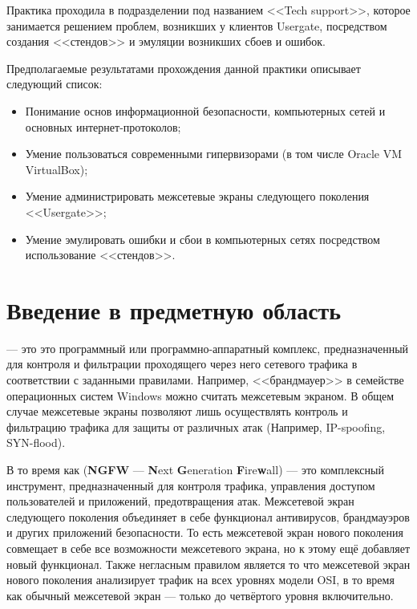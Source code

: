 \begin{justify}
		Практика проходила в подразделении под названием <<Tech support>>, которое занимается решением проблем, возникших у клиентов Usergate, посредством создания <<стендов>> и эмуляции возникших сбоев и ошибок.
		
		Предполагаемые результатами прохождения данной практики описывает следующий список:

		\begin{itemize}[nosep]
			\item Понимание основ информационной безопасности, компьютерных сетей и основных интернет-протоколов;
				
			\item Умение пользоваться современными гипервизорами (в том числе Oracle VM VirtualBox);
			
			\item Умение администрировать межсетевые экраны следующего поколения <<Usergate>>;
			
			\item Умение эмулировать ошибки и сбои в компьютерных сетях посредством использование <<стендов>>.
		\end{itemize}
	\end{justify}
\section{Введение в предметную область}
	\begin{justify}
		\newPar{}  --- это это программный или программно-аппаратный комплекс, предназначенный для контроля и фильтрации проходящего через него сетевого трафика в соответствии с заданными правилами. Например, <<брандмауер>> в семействе операционных систем Windows можно считать межсетевым экраном. В общем случае межсетевые экраны позволяют лишь осуществлять контроль и фильтрацию трафика для защиты от различных атак (Например, IP-spoofing, SYN-flood).
		
		В то время как  (\textbf{NGFW} --- \textbf{N}ext \textbf{G}eneration \textbf{F}ire\textbf{w}all) --- это комплексный инструмент, предназначенный для контроля трафика, управления доступом пользователей и приложений, предотвращения атак. Межсетевой экран следующего поколения объединяет в себе функционал антивирусов, брандмауэров и других приложений безопасности. То есть межсетевой экран нового поколения совмещает в себе все возможности межсетевого экрана, но к этому ещё добавляет новый функционал. Также негласным правилом является то что межсетевой экран нового поколения анализирует трафик на всех уровнях модели OSI, в то время как обычный межсетевой экран --- только до четвёртого уровня включительно.
	\end{justify}
